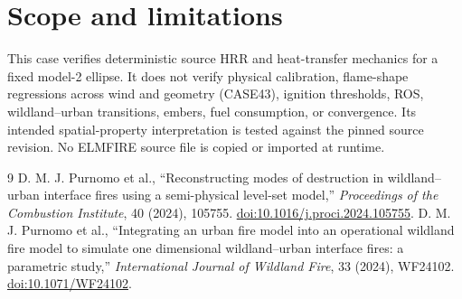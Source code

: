 \section{Scope and limitations}

This case verifies deterministic source HRR and heat-transfer mechanics for a
fixed model-2 ellipse.  It does not verify physical calibration, flame-shape
regressions across wind and geometry (CASE43), ignition thresholds, ROS,
wildland--urban transitions, embers, fuel consumption, or convergence.  Its
intended spatial-property interpretation is tested against the pinned source
revision. No ELMFIRE
source file is copied or imported at runtime.

\begin{thebibliography}{9}
 D. M. J. Purnomo et al., ``Reconstructing modes of destruction in wildland--urban interface fires using a semi-physical level-set model,'' \emph{Proceedings of the Combustion Institute}, 40 (2024), 105755. \href{https://doi.org/10.1016/j.proci.2024.105755}{doi:10.1016/j.proci.2024.105755}.
 D. M. J. Purnomo et al., ``Integrating an urban fire model into an operational wildland fire model to simulate one dimensional wildland--urban interface fires: a parametric study,'' \emph{International Journal of Wildland Fire}, 33 (2024), WF24102. \href{https://doi.org/10.1071/WF24102}{doi:10.1071/WF24102}.
\end{thebibliography}
